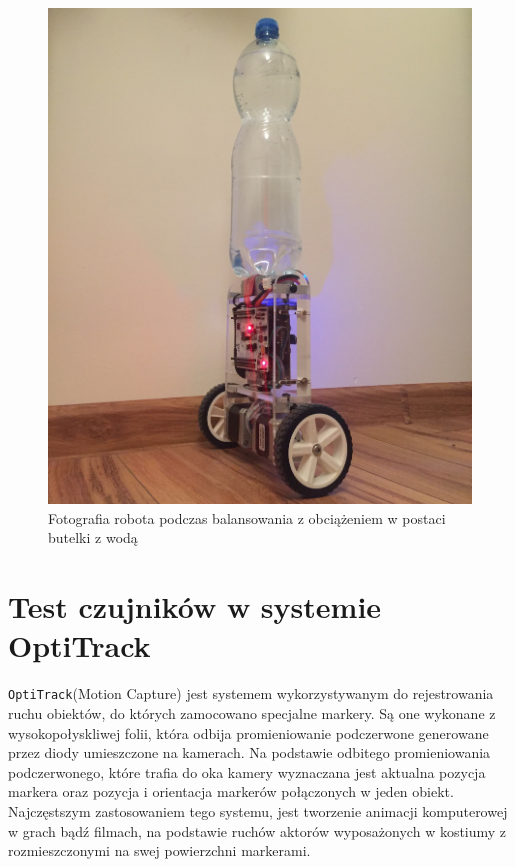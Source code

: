 \begin{figure}[h!]
    \centering
    \includegraphics[width=1\textwidth]{Rysunki/Rozdzial07/Butelka_zdjecie.png}
    \caption{Fotografia robota podczas balansowania z obciążeniem w postaci butelki z wodą}
    \label{Z butelka}
\end{figure}

\section{Test czujników w systemie OptiTrack}

\texttt{OptiTrack}(Motion Capture) jest systemem wykorzystywanym do rejestrowania ruchu obiektów, do których zamocowano specjalne markery. Są one wykonane z wysokopołyskliwej folii, która odbija promieniowanie podczerwone generowane przez diody umieszczone na kamerach. Na podstawie odbitego promieniowania podczerwonego, które trafia do oka kamery wyznaczana jest aktualna pozycja markera oraz pozycja i orientacja markerów połączonych w jeden obiekt. Najczęstszym zastosowaniem tego systemu, jest tworzenie animacji komputerowej w grach bądź filmach, na podstawie ruchów aktorów wyposażonych w kostiumy z rozmieszczonymi na swej powierzchni markerami.

